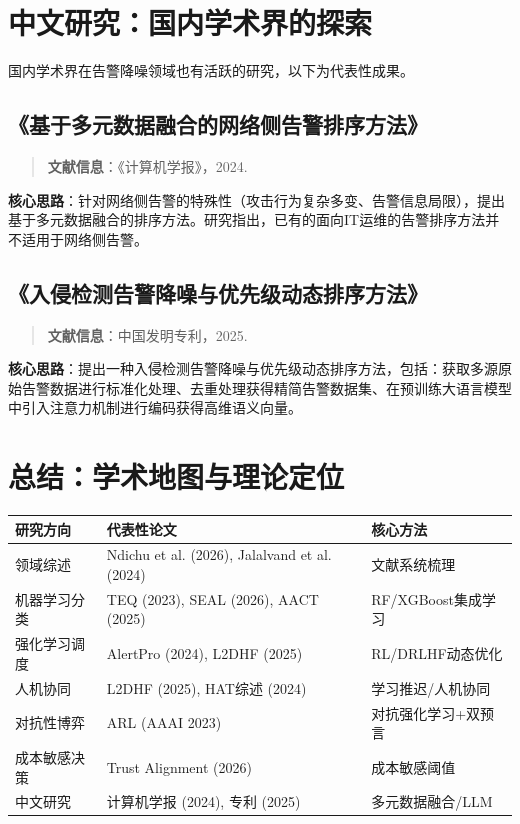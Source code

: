 \documentclass[11pt,a4paper]{article}
\begin{document}
\section{中文研究：国内学术界的探索}

国内学术界在告警降噪领域也有活跃的研究，以下为代表性成果。

\subsection{《基于多元数据融合的网络侧告警排序方法》}

\begin{quote}
\textbf{文献信息}：《计算机学报》，2024.
\end{quote}

\textbf{核心思路}：针对网络侧告警的特殊性（攻击行为复杂多变、告警信息局限），提出基于多元数据融合的排序方法。研究指出，已有的面向IT运维的告警排序方法并不适用于网络侧告警。

\subsection{《入侵检测告警降噪与优先级动态排序方法》}

\begin{quote}
\textbf{文献信息}：中国发明专利，2025.
\end{quote}

\textbf{核心思路}：提出一种入侵检测告警降噪与优先级动态排序方法，包括：获取多源原始告警数据进行标准化处理、去重处理获得精简告警数据集、在预训练大语言模型中引入注意力机制进行编码获得高维语义向量。

\section{总结：学术地图与理论定位}

\begin{center}
\begin{xltabular}{\textwidth}{>{\raggedright\arraybackslash}p{2.8cm}>{\raggedright\arraybackslash}p{4.8cm}>{\raggedright\arraybackslash}p{5cm}}
\toprule
\textbf{研究方向} & \textbf{代表性论文} & \textbf{核心方法} \\
\midrule
领域综述 & Ndichu et al. (2026), Jalalvand et al. (2024) & 文献系统梳理 \\
机器学习分类 & TEQ (2023), SEAL (2026), AACT (2025) & RF/XGBoost集成学习 \\
强化学习调度 & AlertPro (2024), L2DHF (2025) & RL/DRLHF动态优化 \\
人机协同 & L2DHF (2025), HAT综述 (2024) & 学习推迟/人机协同 \\
对抗性博弈 & ARL (AAAI 2023) & 对抗强化学习+双预言 \\
成本敏感决策 & Trust Alignment (2026) & 成本敏感阈值 \\
中文研究 & 计算机学报 (2024), 专利 (2025) & 多元数据融合/LLM \\
\bottomrule
\end{xltabular}
\end{center}
\end{document}
